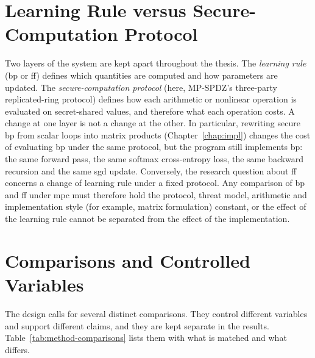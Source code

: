 \section{Learning Rule versus Secure-Computation Protocol}\label{sec:method-separation}
Two layers of the system are kept apart throughout the thesis. The \emph{learning rule} (\ac{bp} or \ac{ff}) defines which quantities are computed and how parameters are updated. The \emph{secure-computation protocol} (here, MP-SPDZ's three-party replicated-ring protocol) defines how each arithmetic or nonlinear operation is evaluated on secret-shared values, and therefore what each operation costs. A change at one layer is not a change at the other. In particular, rewriting secure \ac{bp} from scalar loops into matrix products (Chapter~\ref{chap:impl}) changes the cost of evaluating \ac{bp} under the same protocol, but the program still implements \ac{bp}: the same forward pass, the same softmax cross-entropy loss, the same backward recursion and the same \ac{sgd} update. Conversely, the research question about \ac{ff} concerns a change of learning rule under a fixed protocol. Any comparison of \ac{bp} and \ac{ff} under \ac{mpc} must therefore hold the protocol, threat model, arithmetic and implementation style (for example, matrix formulation) constant, or the effect of the learning rule cannot be separated from the effect of the implementation.

\section{Comparisons and Controlled Variables}\label{sec:method-comparisons}
The design calls for several distinct comparisons. They control different variables and support different claims, and they are kept separate in the results. Table~\ref{tab:method-comparisons} lists them with what is matched and what differs.

